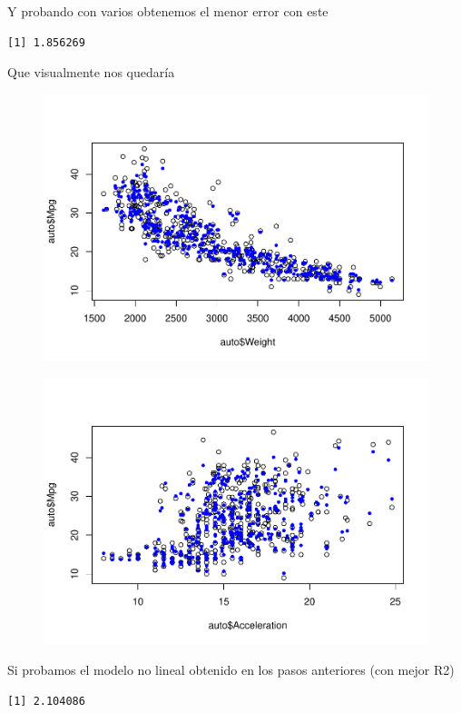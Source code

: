 Y probando con varios obtenemos el menor error con este

\begin{verbatim}
[1] 1.856269
\end{verbatim}

Que visualmente nos quedaría

\begin{figure}[H]\includegraphics[width=.9\linewidth]{img/Regresion_files/figure-latex/unnamed-chunk-29-1} \caption{}\end{figure}

\begin{figure}[H]\includegraphics[width=.9\linewidth]{img/Regresion_files/figure-latex/unnamed-chunk-29-2} \caption{}\end{figure}

Si probamos el modelo no lineal obtenido en los pasos anteriores (con mejor R2)

\begin{verbatim}
[1] 2.104086
\end{verbatim}

